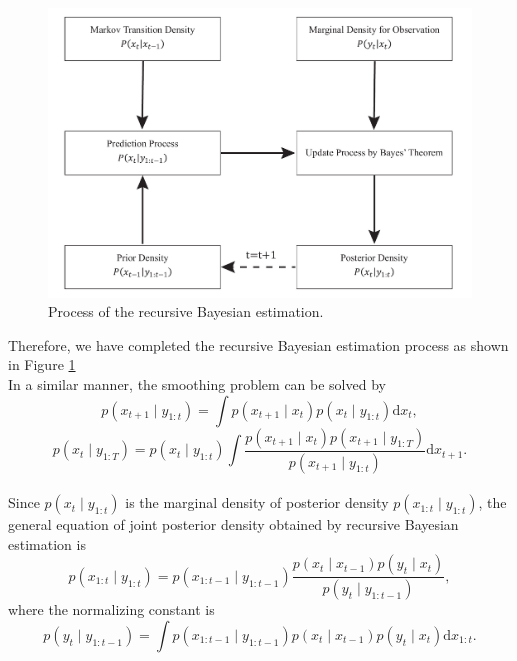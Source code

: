 \documentclass[mstat,12pt]{unswthesis}  %
\numberwithin{equation}{section}
\begin{document}
\begin{figure}[H]
    \centering
    \includegraphics[width=0.80\linewidth]{pau.pdf}
    \caption{ Process of the recursive Bayesian estimation.}
    \label{fig:pau}
\end{figure}

\noindent Therefore, we have completed the recursive Bayesian estimation process as shown in Figure \ref{fig:pau}\\



\noindent In a similar manner, the smoothing problem can be solved by
\begin{equation}p\left(x_{t+1} \mid y_{1: t}\right)=\int p\left(x_{t+1} \mid x_{t}\right) p\left(x_{t} \mid y_{1: t}\right) \mathrm{d} x_{t},\end{equation}
\begin{equation}p\left(x_{t} \mid y_{1: T}\right)=p\left(x_{t} \mid y_{1: t}\right) \int \frac{p\left(x_{t+1} \mid x_{t}\right) p\left(x_{t+1} \mid y_{1: T}\right)}{p\left(x_{t+1} \mid y_{1: t}\right)} \mathrm{d} x_{t+1}.\end{equation}\\

\noindent Since $p\left(x_{t}\mid y_{1:t} \right)$
is the marginal density of posterior density 
$p\left(x_{1:t}\mid y_{1:t} \right)$, the general equation
of joint posterior density obtained by recursive Bayesian estimation
is 
\begin{equation}\label{re}
p\left(x_{1:t} \mid y_{1:t}\right)
=p\left(x_{1:t-1} \mid y_{1:t-1}\right) \frac{p\left(x_{t} \mid x_{t-1}\right) p\left(y_{t} \mid x_{t}\right)}{p\left(y_{t} \mid y_{1:t-1}\right)},
\end{equation}
where the normalizing constant is 
\begin{equation}\label{y}
    p\left(y_{t} \mid y_{1: t-1}\right)=
    \int p\left(x_{1:t-1} \mid y_{1:t-1}\right)
    p\left(x_{t} \mid x_{t-1}\right) p\left(y_{t} \mid x_{t}\right) \mathrm{d} x_{1:t}.
\end{equation}
\end{document}
